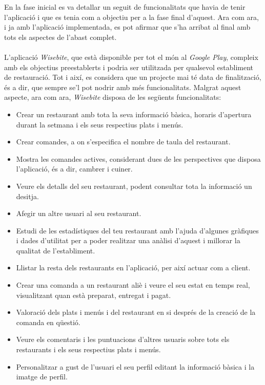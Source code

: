 En la fase inicial es va detallar un seguit de funcionalitats que havia de tenir l'aplicació i que es tenia com a objectiu per a la fase final d'aquest. Ara com ara, i ja amb l'aplicació implementada, es pot afirmar que s'ha arribat al final amb tots els aspectes de l'abast complet.
\\\\
L'aplicació \textit{Wisebite}, que està disponible per tot el món al \textit{Google Play}\cite{wisebite_googleplay}, compleix amb els objectius preestablerts i podria ser utilitzada per qualsevol establiment de restauració. Tot i així, es considera que un projecte mai té data de finalització, és a dir, que sempre se'l pot nodrir amb més funcionalitats. Malgrat aquest aspecte, ara com ara, \textit{Wisebite} disposa de les següents funcionalitats:
\\
\begin{itemize}
\item Crear un restaurant amb tota la seva informació bàsica, horaris d'apertura durant la setmana i els seus respectius plats i menús.
\item Crear comandes, a on s'especifica el nombre de taula del restaurant.
\item Mostra les comandes actives, considerant dues de les perspectives que disposa l'aplicació, és a dir, cambrer i cuiner.
\item Veure els detalls del seu restaurant, podent consultar tota la informació un desitja.
\item Afegir un altre usuari al seu restaurant.
\item Estudi de les estadístiques del teu restaurant amb l'ajuda d'algunes gràfiques i dades d'utilitat per a poder realitzar una anàlisi d'aquest i millorar la qualitat de l'establiment.
\item Llistar la resta dels restaurants en l'aplicació, per així actuar com a client.
\item Crear una comanda a un restaurant aliè i veure el seu estat en temps real, visualitzant quan està preparat, entregat i pagat.
\item Valoració dels plats i menús i del restaurant en si després de la creació de la comanda en qüestió.
\item Veure els comentaris i les puntuacions d'altres usuaris sobre tots els restaurants i els seus respectius plats i menús.
\item Personalitzar a gust de l'usuari el seu perfil editant la informació bàsica i la imatge de perfil.
\end{itemize}

